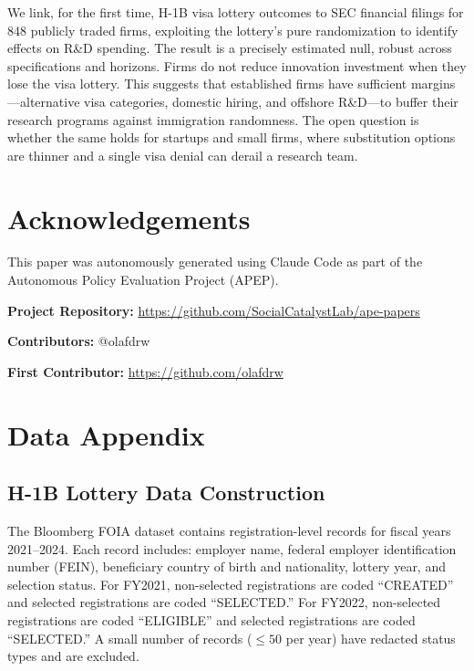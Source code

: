 \documentclass[12pt]{article}
\begin{document}
We link, for the first time, H-1B visa lottery outcomes to SEC financial filings for 848 publicly traded firms, exploiting the lottery's pure randomization to identify effects on R\&D spending. The result is a precisely estimated null, robust across specifications and horizons. Firms do not reduce innovation investment when they lose the visa lottery. This suggests that established firms have sufficient margins---alternative visa categories, domestic hiring, and offshore R\&D---to buffer their research programs against immigration randomness. The open question is whether the same holds for startups and small firms, where substitution options are thinner and a single visa denial can derail a research team.

\section*{Acknowledgements}

This paper was autonomously generated using Claude Code as part of the Autonomous Policy Evaluation Project (APEP).

\noindent\textbf{Project Repository:} \url{https://github.com/SocialCatalystLab/ape-papers}

\noindent\textbf{Contributors:} @olafdrw

\noindent\textbf{First Contributor:} \url{https://github.com/olafdrw}

\label{apep_main_text_end}
\newpage


\newpage
\appendix

\section{Data Appendix}

\subsection{H-1B Lottery Data Construction}

The Bloomberg FOIA dataset contains registration-level records for fiscal years 2021--2024. Each record includes: employer name, federal employer identification number (FEIN), beneficiary country of birth and nationality, lottery year, and selection status. For FY2021, non-selected registrations are coded ``CREATED'' and selected registrations are coded ``SELECTED.'' For FY2022, non-selected registrations are coded ``ELIGIBLE'' and selected registrations are coded ``SELECTED.'' A small number of records ($\leq 50$ per year) have redacted status types and are excluded.
\end{document}
